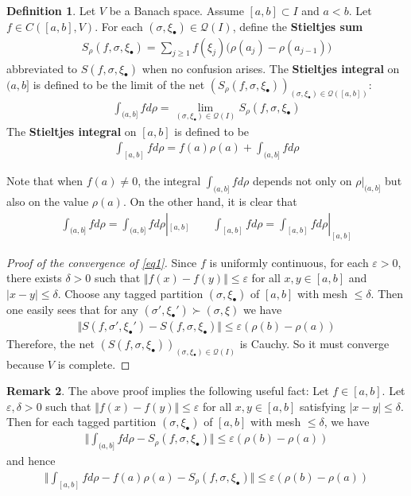 \documentclass[12pt,b5paper,notitlepage]{article}
\theoremstyle{definition}
\newtheorem{df}{Definition}[section]
\newtheorem{rem}[df]{Remark}
\theoremstyle{plain}
\newcommand{\mc}{\mathcal}
\newcommand{\blt}{\bullet}
\newcommand{\eps}{\varepsilon}
\numberwithin{equation}{section}
\begin{document}
\begin{df}\label{lb66}
Let $V$ be a Banach space. Assume $[a,b]\subset I$ and $a<b$. Let $f\in C([a,b],V)$. For each $(\sigma,\xi_\blt)\in\mc Q(I)$, define the \textbf{Stieltjes sum} \index{Sf@$S_\rho(f,\sigma,\xi_\blt)$}
\begin{align*}
S_\rho(f,\sigma,\xi_\blt)=\sum_{j\geq 1}f(\xi_j)\big(\rho(a_j)-\rho(a_{j-1})\big)
\end{align*}
abbreviated to $S(f,\sigma,\xi_\blt)$ when no confusion arises. The \textbf{Stieltjes integral}  on $(a,b]$ is defined to be the limit of the net $(S_\rho(f,\sigma,\xi_\blt))_{(\sigma,\xi_\blt)\in\mc Q([a,b])}$:
\begin{align}\label{eq1}
\int_{(a,b]} fd\rho=\lim_{(\sigma,\xi_\blt)\in\mc Q(I)}S_\rho(f,\sigma,\xi_\blt)
\end{align}
The \textbf{Stieltjes integral} on $[a,b]$ is defined to be
\begin{align}
\int_{[a,b]}fd\rho=f(a)\rho(a)+\int_{(a,b]}fd\rho
\end{align}
\end{df}


Note that when $f(a)\neq0$, the integral $\int_{(a,b]}fd\rho$ depends not only on $\rho|_{(a,b]}$ but also on the value $\rho(a)$. On the other hand, it is clear that
\begin{gather}
\int_{(a,b]}fd\rho=\int_{(a,b]}fd\rho|_{[a,b]}\qquad \int_{[a,b]}fd\rho=\int_{[a,b]}fd\rho|_{[a,b]}
\end{gather}


\begin{proof}[Proof of the convergence of \eqref{eq1}]
Since $f$ is uniformly continuous, for each $\eps>0$, there exists $\delta>0$ such that $\Vert f(x)-f(y)\Vert\leq\eps$ for all $x,y\in[a,b]$ and $|x-y|\leq\delta$. Choose any tagged partition $(\sigma,\xi_\blt)$ of $[a,b]$ with mesh $\leq\delta$. Then one easily sees that for any $(\sigma',\xi_\blt')\succ(\sigma,\xi)$ we have
\begin{align*}
\Vert S(f,\sigma',\xi_\blt')-S(f,\sigma,\xi_\blt)\Vert\leq \eps(\rho(b)-\rho(a))
\end{align*}
Therefore, the net $(S(f,\sigma,\xi_\blt))_{(\sigma,\xi_\blt)\in\mc Q(I)}$ is Cauchy. So it must converge because $V$ is complete.
\end{proof}

\begin{rem}\label{lb63}
The above proof implies the following useful fact: Let $f\in[a,b]$. Let $\eps,\delta>0$ such that $\Vert f(x)-f(y)\Vert\leq\eps$ for all $x,y\in[a,b]$ satisfying $|x-y|\leq\delta$. Then for each tagged partition $(\sigma,\xi_\blt)$ of $[a,b]$ with mesh $\leq\delta$, we have
\begin{align}
\Big\Vert \int_{(a,b]}fd\rho-S_\rho(f,\sigma,\xi_\blt)\Big\Vert\leq \eps(\rho(b)-\rho(a))
\end{align}
and hence
\begin{align}
\Big\Vert \int_{[a,b]}fd\rho-f(a)\rho(a)-S_\rho(f,\sigma,\xi_\blt)\Big\Vert\leq \eps(\rho(b)-\rho(a))
\end{align}
\end{rem}
\end{document}
